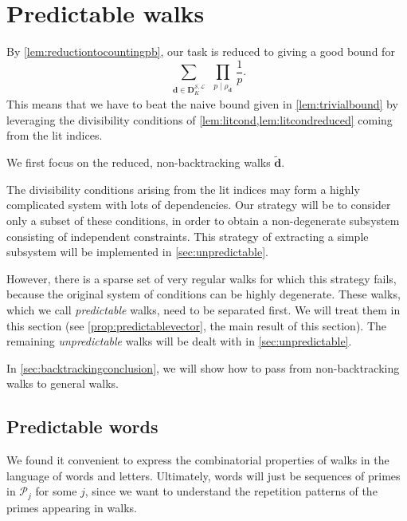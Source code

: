 \documentclass[11pt]{amsart}
\theoremstyle{definition}
\newcommand{\primes}{\mathcal{P}}
\renewcommand{\d}{\boldsymbol{d}}
\newcommand{\fprod}[1]{\rho_{#1}}
\newcommand{\pall}{\fprod{\d}}
\newcommand{\lit}{\mathcal{L}}
\newcommand{\s}{\mathcal{S}}
\newcommand{\fancyD}{\mathbf{D}}
\newcommand{\Dss}{\fancyD^{\s,\lit}_{\!\repK}}
\newcommand{\repK}{K}
\newcommand{\Redd}{\widetilde{\d}}
\begin{document}









\section{Predictable walks}
\label{sec:predictable}

By \cref{lem:reductiontocountingpb}, our task is reduced to giving a good bound for 
\begin{equation}
\label{eq:sumtobound}
\sum_{\substack{\d\in \Dss}}\,\prod_{p\mid \pall}\, \frac{1}{p}.
\end{equation}
This means that we have to beat the naive bound given in \cref{lem:trivialbound} by leveraging the divisibility conditions of \cref{lem:litcond,lem:litcondreduced} coming from the lit indices.

We first focus on the reduced, non-backtracking walks $\Redd$. 

The divisibility conditions arising from the lit indices may form a highly complicated system with lots of dependencies. Our strategy will be to consider only a subset of these conditions, in order to obtain a non-degenerate subsystem consisting of independent constraints. This strategy of extracting a simple subsystem will be implemented in \cref{sec:unpredictable}.

However, there is a sparse set of very regular walks for which this strategy fails, because the original system of conditions can be highly degenerate. These walks, which we call \emph{predictable} walks, need to be separated first. We will treat them in this section (see \cref{prop:predictablevector}, the main result of this section). The remaining \emph{unpredictable} walks will be dealt with in \cref{sec:unpredictable}.

In \cref{sec:backtrackingconclusion}, we will show how to pass from non-backtracking walks to general walks. 


\subsection{Predictable words}

We found it convenient to express the combinatorial properties of walks in the language of words and letters. Ultimately, words will just be sequences of primes in $\primes_j$ for some $j$, since we want to understand the repetition patterns of the primes appearing in walks.
\end{document}
